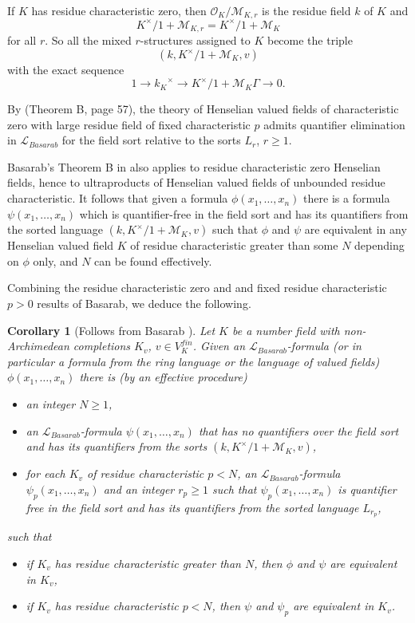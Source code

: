 \documentclass[12pt]{amsart}
\def\cL{\mathcal{L}}
\def\cL{\mathcal{L}}
\newtheorem{cor}{Corollary}[section]
\numberwithin{equation}{section}
\begin{document}
If $K$ has residue characteristic zero, then $\mathcal{O}_{K}/\mathcal{M}_{K,r}$ is the residue field $k$ of $K$ and $$K^{\times}/1+\mathcal{M}_{K,r}=K^{\times}/1+\mathcal{M}_{K}$$ for all $r$. So all the mixed $r$-structures assigned to $K$ become the triple 
$$(k,K^{\times}/1+\mathcal{M}_K,v)$$ with the exact sequence 
$$1\rightarrow {k_K}^{\times}\rightarrow K^{\times}/1+\mathcal{M}_{K} \Gamma \rightarrow 0.$$

By \cite{basarab} (Theorem B, page 57), the theory of Henselian valued fields of characteristic zero with large residue field of fixed characteristic $p$ admits quantifier elimination in $\cL_{Basarab}$ for the field sort relative to the sorts $L_r$, $r\geq 1$.

Basarab's Theorem B in \cite{basarab} also applies to residue characteristic zero Henselian fields, hence to ultraproducts of Henselian valued fields of unbounded residue characteristic. It follows that given a formula $\phi(x_1,\dots,x_n)$ there is a formula $\psi(x_1,\dots,x_n)$ which is quantifier-free in the field sort and has its quantifiers from the sorted language $(k,K^{\times}/1+\mathcal{M}_K,v)$ such that $\phi$ and $\psi$ are equivalent in any Henselian valued field $K$ of residue characteristic greater than some $N$ depending on $\phi$ only, and $N$ can be found effectively.

Combining the residue characteristic zero and and fixed residue characteristic $p>0$ results of Basarab, we deduce the following.

\begin{cor}[Follows from Basarab {\cite[Theorem B]{basarab}}]\label{basarab} Let $K$ be a number field with non-Archimedean completions $K_v$, $v\in V_K^{fin}$. Given an $\cL_{Basarab}$-formula (or in particular a formula from the ring language or the language of valued fields) $\phi(x_1,\dots,x_n)$ there is (by an effective procedure)
\begin{itemize}
\item an integer $N\geq 1$,
\item an $\cL_{Basarab}$-formula $\psi(x_1,\dots,x_n)$ that has no quantifiers over the field sort and has its quantifiers from the sorts $(k,K^{\times}/1+\mathcal{M}_K,v)$,
\item for each $K_v$ of residue characteristic $p<N$, an $\cL_{Basarab}$-formula $\psi_p(x_1,\dots,x_n)$ and an integer $r_p\geq 1$ such that $\psi_p(x_1,\dots,x_n)$ is quantifier free in the field sort and has its quantifiers from the sorted language 
$L_{r_p}$,\end{itemize}
such that 
\begin{itemize}
\item if $K_v$ has residue characteristic greater than $N$, then $\phi$ and $\psi$ are equivalent in $K_v$,
\item if $K_v$ has residue characteristic $p<N$, then $\psi$ and $\psi_p$ are equivalent in $K_v$.
\end{itemize}
\end{cor}
\end{document}
